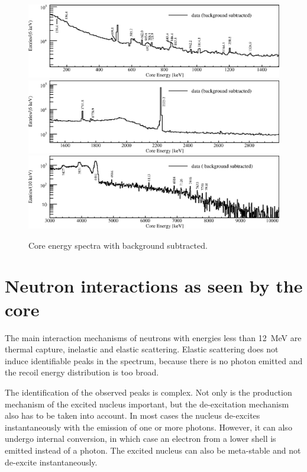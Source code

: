 \begin{figure}[tbhp]
  \centering
  \includegraphics[width=\textwidth,clip]{spectra_0_1d5MeV}
  \includegraphics[width=\textwidth,clip]{spectra_1d5_3MeV}
  \includegraphics[width=\textwidth,clip]{spectra_3_10d2MeV}
  \caption{Core energy spectra with background subtracted.}
  \label{fig:neu:specd}
\end{figure}

\section{Neutron interactions as seen by the core}
\label{sec:neu:type}
The main interaction mechanisms of neutrons with energies less than
12~MeV are thermal capture, inelastic and elastic scattering. Elastic
scattering does not induce identifiable peaks in the spectrum, because
there is no photon emitted and the recoil energy distribution is too
broad.

The identification of the observed peaks is complex. Not only is the
production mechanism of the excited nucleus important, but the
de-excitation mechanism also has to be taken into account. In most
cases the nucleus de-excites instantaneously with the emission of one
or more photons. However, it can also undergo internal conversion, in
which case an electron from a lower shell is emitted instead of a
photon. The excited nucleus can also be meta-stable and not de-excite
instantaneously.

